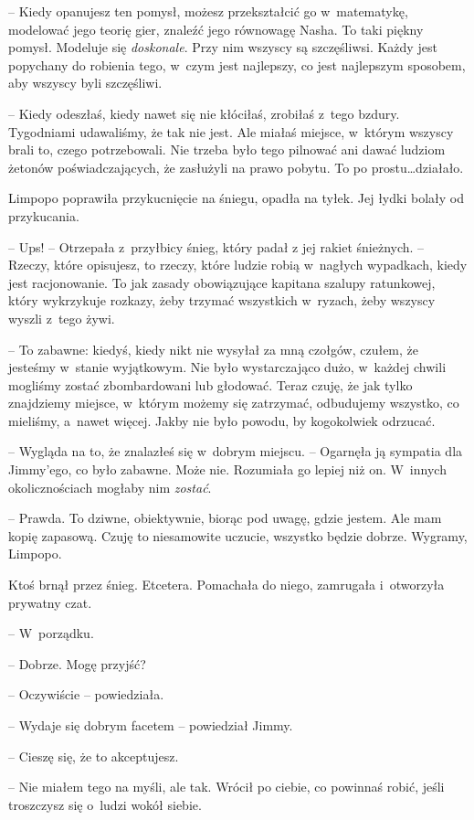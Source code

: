 \documentclass[oneside,polish,11pt,sfheadings]{mwbk}
\begin{document}
-- Kiedy opanujesz ten pomysł, możesz przekształcić go w~matematykę,
modelować jego teorię gier, znaleźć jego równowagę Nasha. To taki piękny
pomysł. Modeluje się \textit{doskonale}. Przy nim wszyscy są szczęśliwsi.
Każdy jest popychany do robienia tego, w~czym jest najlepszy, co jest
najlepszym sposobem, aby wszyscy byli szczęśliwi.

-- Kiedy odeszłaś, kiedy nawet się nie kłóciłaś, zrobiłaś z~tego bzdury.
Tygodniami udawaliśmy, że tak nie jest. Ale miałaś miejsce, w~którym
wszyscy brali to, czego potrzebowali. Nie trzeba było tego pilnować ani
dawać ludziom żetonów poświadczających, że zasłużyli na prawo pobytu. To
po prostu\ldots  działało.

Limpopo poprawiła przykucnięcie na śniegu, opadła na tyłek. Jej łydki
bolały od przykucania. 

-- Ups! -- Otrzepała z~przyłbicy śnieg, który padał
z jej rakiet śnieżnych. -- Rzeczy, które opisujesz, to rzeczy, które
ludzie robią w~nagłych wypadkach, kiedy jest racjonowanie. To jak zasady
obowiązujące kapitana szalupy ratunkowej, który wykrzykuje rozkazy, żeby
trzymać wszystkich w~ryzach, żeby wszyscy wyszli z~tego żywi.

-- To zabawne: kiedyś, kiedy nikt nie wysyłał za mną czołgów, czułem, że
jesteśmy w~stanie wyjątkowym. Nie było wystarczająco dużo, w~każdej
chwili mogliśmy zostać zbombardowani lub głodować. Teraz czuję, że jak
tylko znajdziemy miejsce, w~którym możemy się zatrzymać, odbudujemy
wszystko, co mieliśmy, a~nawet więcej. Jakby nie było powodu, by
kogokolwiek odrzucać.

-- Wygląda na to, że znalazłeś się w~dobrym miejscu. -- Ogarnęła ją
sympatia dla Jimmy'ego, co było zabawne. Może nie. Rozumiała go lepiej
niż on. W~innych okolicznościach mogłaby nim \textit{zostać}.

-- Prawda. To dziwne, obiektywnie, biorąc pod uwagę, gdzie jestem. Ale
mam kopię zapasową. Czuję to niesamowite uczucie, wszystko będzie
dobrze. Wygramy, Limpopo.

Ktoś brnął przez śnieg. Etcetera. Pomachała do niego, zamrugała i~otworzyła prywatny czat. 

-- W~porządku.

-- Dobrze. Mogę przyjść?

-- Oczywiście -- powiedziała.

-- Wydaje się dobrym facetem -- powiedział Jimmy.

-- Cieszę się, że to akceptujesz.

-- Nie miałem tego na myśli, ale tak. Wrócił po ciebie, co powinnaś
robić, jeśli troszczysz się o~ludzi wokół siebie.
\end{document}
